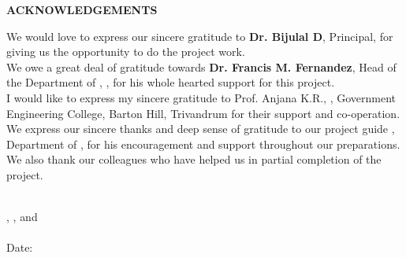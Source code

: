 \thispagestyle{plain}
\begin{center}
 \Large {\bf \uppercase{Acknowledgements}}
\end{center}
\vspace{3\baselineskip}
\justifying
%
%
%
We would love to express our sincere gratitude to 
{\bf Dr. Bijulal D}, Principal,
\University for giving us the opportunity to do the project
work.
\\
 We owe a great deal of gratitude towards {\bf Dr. Francis M. Fernandez}, Head of the Department of \Department, \University, for his whole
hearted support for this project.
\\
I would like to express my sincere gratitude to Prof. Anjana K.R., \Department, Government Engineering College, Barton Hill, Trivandrum for their support and
co-operation.
\\
 We express our sincere thanks and deep sense of gratitude
to our project guide {\bf \Supervisor}, Department of \Department, for his encouragement and support throughout our preparations.
\\
We also thank our colleagues who have helped us in partial completion of the project.

\centering
\noindent
\vspace{\baselineskip} \\
\textbf{\firstAuthor}, \textbf{\secondAuthor}, \textbf{\thirdAuthor} and \textbf{\fourthAuthor}\\
\University \\
Date: \reportSubmissionDate